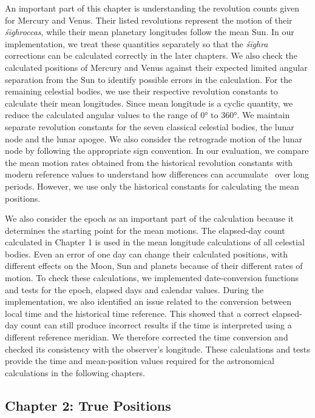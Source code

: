 \documentclass[12pt,a4paper,oneside]{report}
\begin{document}
An important part of this chapter is understanding the revolution counts given for Mercury and Venus. Their listed revolutions represent the motion of their \emph{śīghroccas}, while their mean planetary longitudes follow the mean Sun. In our implementation, we treat these quantities separately so that the \emph{śīghra} corrections can be calculated correctly in the later chapters. We also check the calculated positions of Mercury and Venus against their expected limited angular separation from the Sun to identify possible errors in the calculation. For the remaining celestial bodies, we use their respective revolution constants to calculate their mean longitudes. Since mean longitude is a cyclic quantity, we reduce the calculated angular values to the range of 0° to 360°. We maintain separate revolution constants for the seven classical celestial bodies, the lunar node and the lunar apogee. We also consider the retrograde motion of the lunar node by following the appropriate sign convention. In our evaluation, we compare the mean motion rates obtained from the historical revolution constants with modern reference values to understand how differences can accumulate~\cite{Park2021DE440} over long periods. However, we use only the historical constants for calculating the mean positions.

We also consider the epoch as an important part of the calculation because it determines the starting point for the mean motions. The elapsed-day count calculated in Chapter 1 is used in the mean longitude calculations of all celestial bodies. Even an error of one day can change their calculated positions, with different effects on the Moon, Sun and planets because of their different rates of motion. To check these calculations, we implemented date-conversion functions and tests for the epoch, elapsed days and calendar values. During the implementation, we also identified an issue related to the conversion between local time and the historical time reference. This showed that a correct elapsed-day count can still produce incorrect results if the time is interpreted using a different reference meridian. We therefore corrected the time conversion and checked its consistency with the observer's longitude. These calculations and tests provide the time and mean-position values required for the astronomical calculations in the following chapters.

\subsection{Chapter 2: True Positions}
\end{document}
